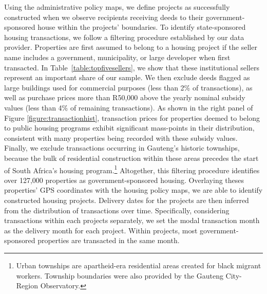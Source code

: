 \documentclass[12pt]{article}
\begin{document}
 Using the administrative policy maps, we define projects as successfully constructed when we observe recipients receiving deeds to their government-sponsored house within the projects' boundaries. To identify state-sponsored housing transactions, we follow a filtering procedure established by our data provider. Properties are first assumed to belong to a housing project if the seller name includes a government, municipality, or large developer when first transacted. In 	\mbox{Table \ref{table:topfivesellers}}, we show that these institutional sellers represent an important share of our sample. We then exclude deeds flagged as large buildings used for commercial purposes (less than 2\% of transactions), as well as purchase prices more than R50,000 above the yearly nominal subsidy values (less than 4\% of remaining transactions). As shown in the right panel of Figure \ref{figure:transactionhist}, transaction prices for properties deemed to belong to public housing programs exhibit significant mass-points in their distribution, consistent with many properties being recorded with these subsidy values. Finally, we exclude transactions occurring in Gauteng's historic townships, because the bulk of residential construction within these areas precedes the start of South Africa's housing program.\footnote{Urban townships are apartheid-era residential areas created for black migrant workers. Township boundaries were also provided by the Gauteng City-Region Observatory.} Altogether, this filtering procedure identifies over 127,000 properties as government-sponsored housing. Overlaying theses properties' GPS coordinates with the housing policy maps, we are able to identify constructed housing projects. Delivery dates for the projects are then inferred from the distribution of transactions over time. Specifically, considering transactions within each projects separately, we set the modal transaction month as the delivery month for each project. Within projects, most government-sponsored properties are transacted in the same month. %
\end{document}

